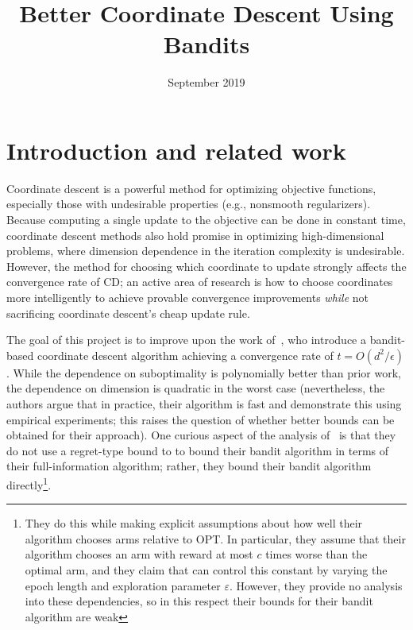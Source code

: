 \documentclass[letterpaper]{article}
\title{Better Coordinate Descent Using Bandits}
\date{September 2019}
\begin{document}
\maketitle


\section{Introduction and related work}

Coordinate descent is a powerful method for optimizing objective functions, especially those with undesirable properties (e.g., nonsmooth regularizers). Because computing a single update to the objective can be done in constant time, coordinate descent methods also hold promise in optimizing high-dimensional problems, where dimension dependence in the iteration complexity is undesirable. However, the method for choosing which coordinate to update strongly affects the convergence rate of CD; an active area of research is how to choose coordinates more intelligently to achieve provable convergence improvements \emph{while} not sacrificing coordinate descent's cheap update rule.

The goal of this project is to improve upon the work of~\cite{salehi2018coordinate}, who introduce a bandit-based coordinate descent algorithm achieving a convergence rate of $t = O(d^2/\epsilon)$. While the dependence on suboptimality is polynomially better than prior work, the dependence on dimension is quadratic in the worst case (nevertheless, the authors argue that in practice, their algorithm is fast and demonstrate this using empirical experiments; this raises the question of whether better bounds can be obtained for their approach). One curious aspect of the analysis of~\cite{salehi2018coordinate} is that they do not use a regret-type bound to to bound their bandit algorithm in terms of their full-information algorithm; rather, they bound their bandit algorithm directly\footnote{They do this while making explicit assumptions about how well their algorithm chooses arms relative to OPT. In particular, they assume that their algorithm chooses an arm with reward at most $c$ times worse than the optimal arm, and they claim that can control this constant by varying the epoch length and exploration parameter $\varepsilon$. However, they provide no analysis into these dependencies, so in this respect their bounds for their bandit algorithm are weak}.
\end{document}
